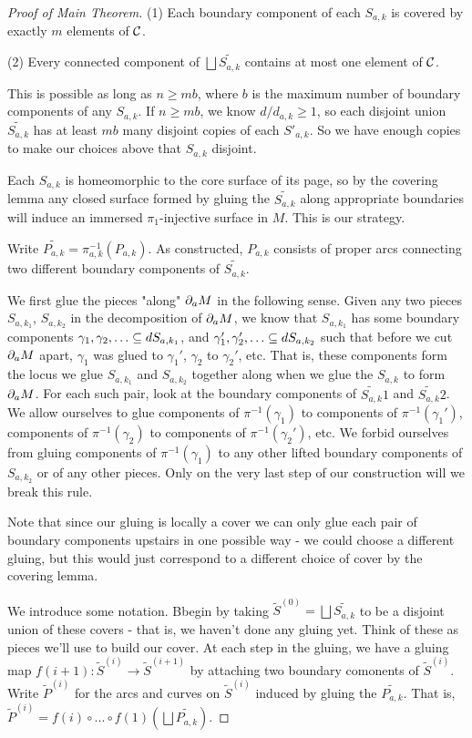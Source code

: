 \begin{proof}[Proof of Main Theorem]
(1) Each boundary component of each $S_{a,k}$ is covered by exactly $m$ elements
of $\mathcal{C}$.

(2) Every connected component of $\bigsqcup \widetilde{S_{a,k}}$ contains at most one element
of $\mathcal{C}$.

This is possible as long as $n \geq mb$, where $b$ is the maximum number of
boundary components of any $S_{a,k}$. If $n\geq mb$, we know $d/d_{a,k} \geq
1$, so each disjoint union $\widetilde{S_{a,k}}$ has at least $mb$ many
disjoint copies of each $S'_{a,k}$.  So we have enough copies to make our choices
above that $S_{a,k}$ disjoint.

Each $S_{a,k}$ is homeomorphic to the core surface of its page, so by the covering
lemma any closed surface formed by gluing the $\widetilde{S_{a,k}}$ along appropriate
boundaries will induce an immersed $\pi_1$-injective surface in $M$. This is
our strategy.

Write $\widetilde{P_{a,k}}=\pi_{a,k}^{-1}(P_{a,k})$. As constructed, $P_{a,k}$ consists of proper arcs
connecting two different boundary components of $\widetilde{S_{a,k}}$.

We first glue the pieces "along" $\partial_aM$ in the following sense. Given any two
pieces $S_{a,k_1}$, $S_{a,k_2}$ in the decomposition of $\partial_aM$, we know that
$S_{a,k_1}$ has some boundary components $\gamma_1,\gamma_2,\dots \cin
dS_{a,k_1}$, and $\gamma_1',\gamma_2',\dots \cin dS_{a,k_2}$ such that before we
cut $\partial_aM$ apart, $\gamma_1$ was glued to $\gamma_1'$, $\gamma_2$ to
$\gamma_2'$, etc.  That is, these components form the locus we glue $S_{a,k_1}$
and $S_{a,k_2}$ together along when we glue the $S_{a,k}$ to form $\partial_aM$.  For
each such pair, look at the boundary components of $\widetilde{S_{a,k}}1$ and
$\widetilde{S_{a,k}}2$.  We allow ourselves to glue components of
$\pi^{-1}(\gamma_1)$ to components of $\pi^{-1}(\gamma_1')$, components of
$\pi^{-1}(\gamma_2)$ to components of $\pi^{-1}(\gamma_2')$, etc. We forbid
ourselves from gluing components of $\pi^{-1}(\gamma_1)$ to any other lifted
boundary components of $S_{a,k_2}$ or of any other pieces. Only on the very last
step of our construction will we break this rule.

Note that since our gluing is locally a cover we can only glue each pair of
boundary components upstairs in one possible way - we could choose a different
gluing, but this would just correspond to a different choice of cover by the
covering lemma.

We introduce some notation. Bbegin by taking $\widetilde{S}^{(0)} = \bigsqcup \widetilde{S_{a,k}}$ to
be a disjoint union of these covers - that is, we haven't done any gluing yet.
Think of these as pieces we'll use to build our cover. At each step in the
gluing, we have a gluing map $f(i+1) \colon \widetilde{S}^{(i)} \to
\widetilde{S}^{(i+1)}$ by attaching two boundary comonents of
$\widetilde{S}^{(i)}$. Write $\widetilde{P}^{(i)}$ for the arcs and curves on
$\widetilde{S}^{(i)}$ induced by gluing the $\widetilde{P_{a,k}}$.  That is,
$\widetilde{P}^{(i)} = f(i) \circ ...  \circ f(1) (\bigsqcup
\widetilde{P_{a,k}})$.


\end{proof}
